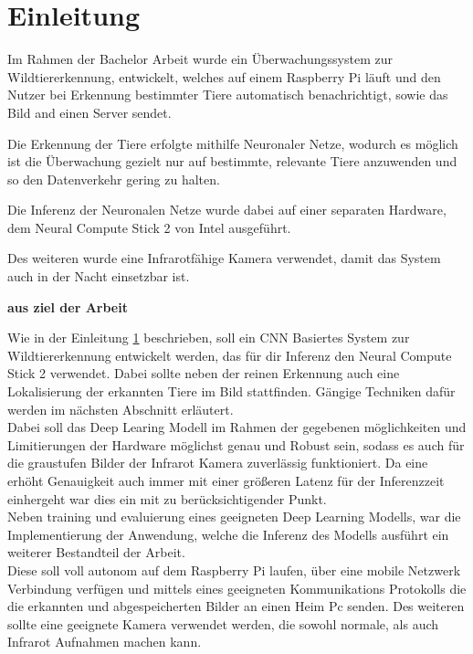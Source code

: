 \chapter{Einleitung}\label{kap:einleitung}

Im Rahmen der Bachelor Arbeit wurde ein Überwachungssystem zur Wildtiererkennung,
entwickelt, welches auf einem Raspberry Pi läuft und den Nutzer bei Erkennung
bestimmter Tiere automatisch benachrichtigt, sowie das Bild and einen Server sendet.

Die Erkennung der Tiere erfolgte mithilfe Neuronaler Netze, wodurch es möglich ist 
die Überwachung gezielt nur auf bestimmte, relevante Tiere anzuwenden und so den
Datenverkehr gering zu halten. 

Die Inferenz der Neuronalen Netze wurde dabei auf einer separaten Hardware, dem 
Neural Compute Stick 2 von Intel ausgeführt.

Des weiteren wurde eine Infrarotfähige Kamera verwendet, damit das System auch
in der Nacht einsetzbar ist.


\textbf{aus ziel der Arbeit}



Wie in der Einleitung \ref{kap:einleitung} beschrieben, soll 
ein CNN Basiertes System zur Wildtiererkennung entwickelt 
werden, das für dir Inferenz den Neural Compute Stick 2 verwendet.
Dabei sollte neben der reinen Erkennung auch eine Lokalisierung 
der erkannten Tiere im Bild stattfinden. Gängige Techniken dafür 
werden im nächsten Abschnitt erläutert.
\\
Dabei soll das Deep Learing Modell im Rahmen der gegebenen 
möglichkeiten und Limitierungen der Hardware möglichst 
genau und Robust sein, sodass es auch für die graustufen 
Bilder der Infrarot Kamera zuverlässig funktioniert.
Da eine erhöht Genauigkeit auch immer mit einer größeren
Latenz für der Inferenzzeit einhergeht war dies ein mit 
zu berücksichtigender Punkt.
\\
Neben training und evaluierung eines geeigneten Deep Learning Modells,
war die Implementierung der Anwendung, welche die Inferenz 
des Modells ausführt ein weiterer Bestandteil der Arbeit.
\\
Diese soll voll autonom auf dem Raspberry Pi laufen,
über eine mobile Netzwerk Verbindung verfügen und 
mittels eines geeigneten Kommunikations Protokolls die 
die erkannten und abgespeicherten Bilder an einen
Heim Pc senden.
Des weiteren sollte eine geeignete Kamera verwendet werden, die 
sowohl normale, als auch Infrarot Aufnahmen machen kann.
